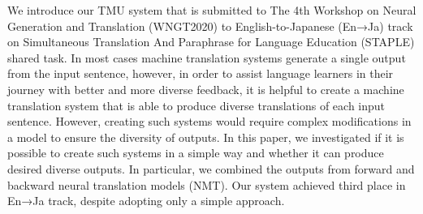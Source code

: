 We introduce our TMU system that is submitted to The 4th Workshop on Neural Generation and Translation (WNGT2020) to English-to-Japanese (En→Ja) track on Simultaneous Translation And Paraphrase for Language Education (STAPLE) shared task. In most cases machine translation systems generate a single output from the input sentence, however, in order to assist language learners in their journey with better and more diverse feedback, it is helpful to create a machine translation system that is able to produce diverse translations of each input sentence. However, creating such systems would require complex modifications in a model to ensure the diversity of outputs. In this paper, we investigated if it is possible to create such systems in a simple way and whether it can produce desired diverse outputs. In particular, we combined the outputs from forward and backward neural translation models (NMT). Our system achieved third place in En→Ja track, despite adopting only a simple approach.
